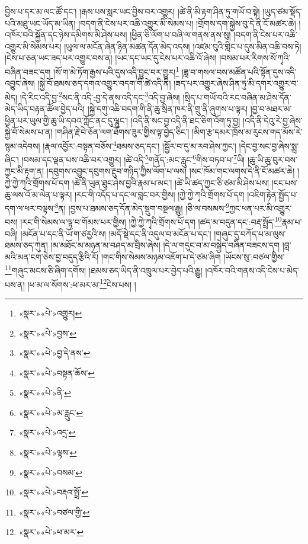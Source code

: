 བྱིས་པ་དར་མ་ལང་ཚོ་དང་། །རྒས་པས་སླར་ཡང་བྱིས་བར་འགྱུར། །ཚེ་ནི་མི་རྟག་ཤིན་ཏུ་གཡོ་བ་སྟེ། །ཡུད་ཙམ་སྡོད་པའི་མཐུ་ཡང་ཡོད་མ་ཡིན། །བདག་ནི་ངེས་པར་འཆི་འགྱུར་མི་སེམས་པ། །གྲོགས་དག་སྐྱེས་བུ་དེ་ནི་ངོ་མཚར་ཆེ། །འཁོར་བའི་སྐྱོན་དང་ཉེས་དམིགས་མི་ཤེས་པས། །ཕྱིན་ཅི་ལོག་པ་བཞི་ལ་གནས་ནས་སུ། །བདག་ནི་ངེས་པར་འཆི་འགྱུར་མི་སེམས་པར། །ཡུལ་ལ་མངོན་ཞེན་ཉིན་མཚན་དོན་མེད་འདས། །འཛམ་བུའི་གླིང་པ་དུས་མིན་འཆི་བས་ཏེ། །ངེས་པ་ཅན་ཡང་ཟད་པར་འགྱུར་བས་ན། །ཡང་དང་ཡང་དུ་ངེས་པར་འཆི་འོ་ཞེས། །བསམ་པར་རིགས་སོ་ཀྭའི་བཞིན་བཟང་དག །སོ་ག་མེ་ཏོག་རྒྱས་པའི་དུས་འདི་བྱུང་བར་གྱུར།\footnote{«སྣར་»«པེ་»འགྱུར།} །ཟླ་བ་གསལ་བས་མཚོན་པའི་སྟོན་དུས་འདི་འབྱུང་ཞེས། །སྐྱེ་བོ་ཐམས་ཅད་དགའ་འགྱུར་བདག་གི་ཚེ་འདི་ནི། །ཟད་པར་འགྱུར་ཞེས་ཤིན་ཏུ་མི་དགར་འགྱུར་བ་མེད། །དེ་རིང་འདི་བྱ་\footnote{«སྣར་»«པེ་»བྱས་}སང་ནི་འདི་:བྱ་དེ་ནས་འདི་དང་\footnote{«སྣར་»«པེ་»བྱ་དེ་ནས་}འདི་བྱ་ཞེས། །སྲིད་པ་གཡོ་བའི་རང་བཞིན་མ་ཤེས་དོན་མེད་ཡིད་བརྟན་ཚོལ་བྱེད་པའི། །སྐྱེ་དགུ་འཆི་བདག་གི་ནི་ཆུ་སྲིན་ཁར་ནི་གྲུ་ནི་ཞུགས་པ་ལྟར། །བྱ་བ་མཐར་མ་ཕྱིན་པར་ཡུལ་གྱི་ཆུ་ཡི་དབའ་ཀློང་ནང་དུ་ལྷུང་། །འདི་ནི་སང་བྱ་འདི་ནི་ཐང་ཅིག་འོག་ཏུ་བྱ། །འདི་ནི་དེའུ་རེ་བྱ་ཞེས་སྐྱེ་བོ་སེམས་པ་ན། །གཤིན་རྗེ་བེ་ཅོན་ལག་ཐོགས་ཟུར་གྱིས་ལྟ་བྱེད་ཅིང་། །མིག་རྩ་དམར་ཁྲོས་མ་རུངས་གད་མོས་རེ་སྙམ་འདེབས། །རྣལ་འབྱོར་:བསྟན་བཅོས་\footnote{«སྣར་»«པེ་»བསྟན་ཆོས་}ཐམས་ཅད་དང་། །སྦྱོར་བ་དུ་མ་རབ་ཤེས་ཀྱང་། །དེང་བྱ་སང་བྱ་ཞེས་སྨྲ་ཞིང་། །བསམ་དང་ལྡན་པས་འཆི་བར་འགྱུར། །ཚེ་འདི་\footnote{«སྣར་»«པེ་»ནི་}གནོད་:མང་རླུང་\footnote{«སྣར་»«པེ་»མ་རླུང་}གིས་བཏབ་པ་\footnote{«སྣར་»«པེ་»འདྲ་}ཡི། །ཆུ་ཡི་ཆུ་བུར་བས་ཀྱང་མི་རྟག་ན། །དབུགས་འབྱུང་དབུགས་རྔུབ་གཉིད་ཀྱིས་ལོག་པ་ལས། །སང་ཁོམ་གང་ལགས་དེ་ནི་ངོ་མཚར་ཆེ། །ཀྱེ་ཀྱེ་ཀྭའི་གྲོགས་པོ་དག །ཚེ་ནི་ཡུན་ཐུང་ཤེས་བྱའི་རྣམ་པ་མང་། །ཚེ་ཡི་ཚད་ཀྱང་ཅི་ཙམ་མི་ཤེས་པས། །ངང་པས་ཆུ་ལས་འོ་མ་ལེན་པ་ལྟར། །རང་གི་འདོད་པ་དང་ལ་བླང་བར་གྱིས། །ཀྱེ་ཀྱེ་ཀྭའི་གྲོགས་པོ་དག །འཇིག་རྟེན་སྤྱོད་པ་དག་ལ་ཕར་བལྟས་\footnote{«སྣར་»«པེ་»ལྟས་}ན། །བྱས་པ་ཐམས་ཅད་དོན་མེད་སྡུག་བསྔལ་རྒྱུ། །ཅི་ལ་བསམས་\footnote{«སྣར་»«པེ་»བསམ་}ཀྱང་ཕན་པར་མི་འགྱུར་བས། །རང་གི་སེམས་ལ་ལྟ་བ་གོམས་པར་གྱིས། །ཀྱེ་ཀྱེ་ཀྭའི་གྲོགས་པོ་དག །ཚད་མ་བདུན་དང་:བརྡ་སྤྲོད་\footnote{«སྣར་»«པེ་»བརྡའ་སྤྲོ་}རྣམ་པ་བཞི། །མངོན་པ་དང་ནི་ཡོ་ག་ཙརྱའི་ས། །མདོ་སྡེ་དང་ནི་འདུལ་བ་མངོན་པ་དང་། །གཞུང་དུ་བཀོད་པ་མ་ལུས་ཐམས་ཅད་ཀུན། །མ་མཐོང་མ་མཉན་མ་བཤད་མ་བྲིས་ཞེས། །དེ་ལ་གདུང་བ་མ་བསྐྱེད་བཞིན་བཟངས་དག །བླ་མའི་མན་ངག་ཅེས་བྱ་བདུད་རྩིའི་རོ། །གང་གིས་སེམས་མཉམ་འཇོག་པ་དེ་ཙམ་ཞིག །ཡོངས་སུ་:བཙལ་གྱིས་\footnote{«སྣར་»«པེ་»བཙལ་གྱི་}གཞུང་མངས་ཅི་ཞིག་དགོས། །ཐམས་ཅད་ཡིད་ནི་འཁྲུལ་པར་བྱེད་པའི་རྒྱུ། །འཁོར་བའི་གནས་འདི་ངེས་པ་མེད་པས་ན། །ཕ་མ་ལ་སོགས་:ཕ་མར་མ་\footnote{«སྣར་»«པེ་»ཕ་མར་}ངེས་པས། །
